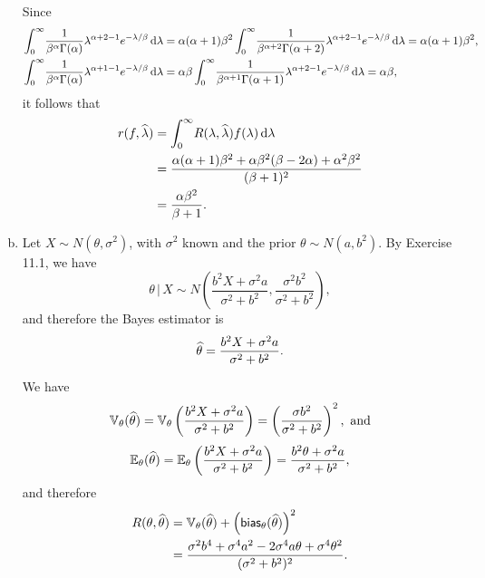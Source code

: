 \begin{ex}
\begin{enumerate}[(a)]
          Since
          \begin{align*}
            \int_0^\infty\!
            \frac{1}{\beta^\alpha\Gamma(\alpha)}\lambda^{\alpha+2-1}e^{-\lambda/\beta}\,\mathrm{d}{\lambda}
             & =\alpha(\alpha+1)\beta^2\int_0^\infty\!
            \frac{1}{\beta^{\alpha+2}\Gamma(\alpha+2)}\lambda^{\alpha+2-1}e^{-\lambda/\beta}\,\mathrm{d}{\lambda}
            =\alpha(\alpha+1)\beta^2,                  \\
            \int_0^\infty\!
            \frac{1}{\beta^\alpha\Gamma(\alpha)}\lambda^{\alpha+1-1}e^{-\lambda/\beta}\,\mathrm{d}{\lambda}
             & =\alpha\beta\int_0^\infty\!
            \frac{1}{\beta^{\alpha+1}\Gamma(\alpha+1)}\lambda^{\alpha+2-1}e^{-\lambda/\beta}\,\mathrm{d}{\lambda}
            =\alpha\beta,
          \end{align*}
          it follows that
          \begin{align*}
            r(f,\widehat{\lambda})
             & =\int_0^\infty\!R(\lambda,\widehat{\lambda})f(\lambda)\,\mathrm{d}{\lambda}                         \\
             & =\frac{\alpha(\alpha+1)\beta^2+\alpha\beta^2(\beta-2\alpha)+\alpha^2\beta^2}{(\beta+1)^2}   \\
             & =\frac{\alpha\beta^2}{\beta+1}                                                            .
          \end{align*}
    \item Let $X\sim N(\theta,\sigma^2)$, with $\sigma^2$ known and the prior
          $\theta\sim N(a,b^2)$. By Exercise 11.1, we have
          \[
            \theta\,|\,X\sim N\left(\frac{b^2X+\sigma^2a}{\sigma^2+b^2},
            \frac{\sigma^2b^2}{\sigma^2+b^2} \right),
          \]
          and therefore the Bayes estimator is
          \[
            \widehat{\theta}=\frac{b^2X+\sigma^2a}{\sigma^2+b^2}.
          \]

          We have
          \[
            \mathbb{V}_\theta(\widehat{\theta})
            =\mathbb{V}_\theta\left(\frac{b^2X+\sigma^2a}{\sigma^2+b^2}\right)
            =\left(\frac{\sigma b^2}{\sigma^2+b^2}\right)^2,\text{ and}
          \]
          \[
            \mathbb{E}_\theta(\widehat{\theta})
            =\mathbb{E}_\theta\left(\frac{b^2X+\sigma^2a}{\sigma^2+b^2}\right)
            =\frac{b^2\theta+\sigma^2a}{\sigma^2+b^2},
          \]
          and therefore
          \begin{align*}
            R(\theta,\widehat{\theta})
             & =\mathbb{V}_\theta(\widehat{\theta})
            +\left(\textsf{bias}_\theta(\widehat{\theta})\right)^2                                         \\
             & =\frac{\sigma^2b^4+\sigma^4a^2-2\sigma^4a\theta+\sigma^4\theta^2}{(\sigma^2+b^2)^2}.
          \end{align*}


\end{enumerate}
\end{ex}
